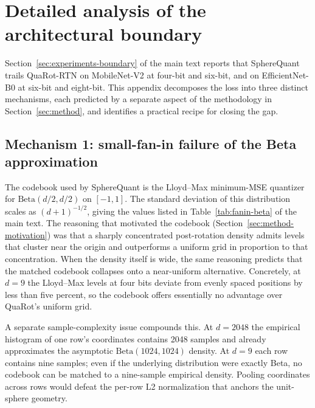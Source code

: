 
\section{Detailed analysis of the architectural boundary}
\label{app:boundary}

Section~\ref{sec:experiments-boundary} of the main text reports that
SphereQuant trails QuaRot-RTN on MobileNet-V2 at four-bit and six-bit, and on
EfficientNet-B0 at six-bit and eight-bit. This appendix decomposes the
loss into three distinct mechanisms, each predicted by a separate aspect
of the methodology in Section~\ref{sec:method}, and identifies a
practical recipe for closing the gap.

\subsection{Mechanism 1: small-fan-in failure of the Beta approximation}
\label{app:beta-failure}

The codebook used by SphereQuant is the Lloyd--Max minimum-MSE quantizer
for $\mathrm{Beta}(d/2, d/2)$ on $[-1, 1]$. The standard deviation of
this distribution scales as $(d+1)^{-1/2}$, giving the values listed in
Table~\ref{tab:fanin-beta} of the main text. The reasoning that
motivated the codebook (Section~\ref{sec:method-motivation}) was that a
sharply concentrated post-rotation density admits levels that cluster
near the origin and outperforms a uniform grid in proportion to that
concentration. When the density itself is wide, the same reasoning
predicts that the matched codebook collapses onto a near-uniform
alternative. Concretely, at $d = 9$ the Lloyd--Max levels at four bits
deviate from evenly spaced positions by less than five percent, so the
codebook offers essentially no advantage over QuaRot's uniform grid.

A separate sample-complexity issue compounds this. At $d = 2048$ the
empirical histogram of one row's coordinates contains 2048 samples and
already approximates the asymptotic $\mathrm{Beta}(1024, 1024)$
density. At $d = 9$ each row contains nine samples; even if the
underlying distribution were exactly Beta, no codebook can be matched
to a nine-sample empirical density. Pooling coordinates across rows
would defeat the per-row L2 normalization that anchors the unit-sphere
geometry.

